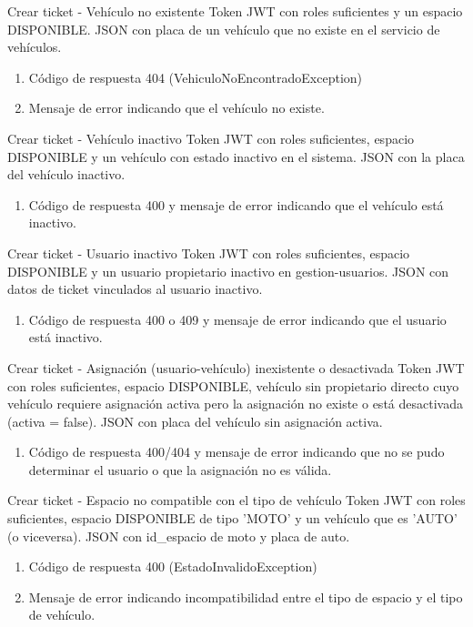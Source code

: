 {Crear ticket - Vehículo no existente}
{Token JWT con roles suficientes y un espacio DISPONIBLE.}
{JSON con placa de un vehículo que no existe en el servicio de vehículos.}
{\begin{enumerate} [leftmargin=*, nosep]
    \item Código de respuesta 404 (VehiculoNoEncontradoException)
    \item Mensaje de error indicando que el vehículo no existe.
\end{enumerate}}

{Crear ticket - Vehículo inactivo}
{Token JWT con roles suficientes, espacio DISPONIBLE y un vehículo con estado inactivo en el sistema.}
{JSON con la placa del vehículo inactivo.}
{\begin{enumerate} [leftmargin=*, nosep]
    \item Código de respuesta 400 y mensaje de error indicando que el vehículo está inactivo.
\end{enumerate}}

{Crear ticket - Usuario inactivo}
{Token JWT con roles suficientes, espacio DISPONIBLE y un usuario propietario inactivo en gestion-usuarios.}
{JSON con datos de ticket vinculados al usuario inactivo.}
{\begin{enumerate} [leftmargin=*, nosep]
    \item Código de respuesta 400 o 409 y mensaje de error indicando que el usuario está inactivo.
\end{enumerate}}

{Crear ticket - Asignación (usuario-vehículo) inexistente o desactivada}
{Token JWT con roles suficientes, espacio DISPONIBLE, vehículo sin propietario directo cuyo vehículo requiere asignación activa pero la asignación no existe o está desactivada (activa = false).}
{JSON con placa del vehículo sin asignación activa.}
{\begin{enumerate} [leftmargin=*, nosep]
    \item Código de respuesta 400/404 y mensaje de error indicando que no se pudo determinar el usuario o que la asignación no es válida.
\end{enumerate}}

{Crear ticket - Espacio no compatible con el tipo de vehículo}
{Token JWT con roles suficientes, espacio DISPONIBLE de tipo 'MOTO' y un vehículo que es 'AUTO' (o viceversa).}
{JSON con id\_espacio de moto y placa de auto.}
{\begin{enumerate} [leftmargin=*, nosep]
    \item Código de respuesta 400 (EstadoInvalidoException)
    \item Mensaje de error indicando incompatibilidad entre el tipo de espacio y el tipo de vehículo.
\end{enumerate}}

